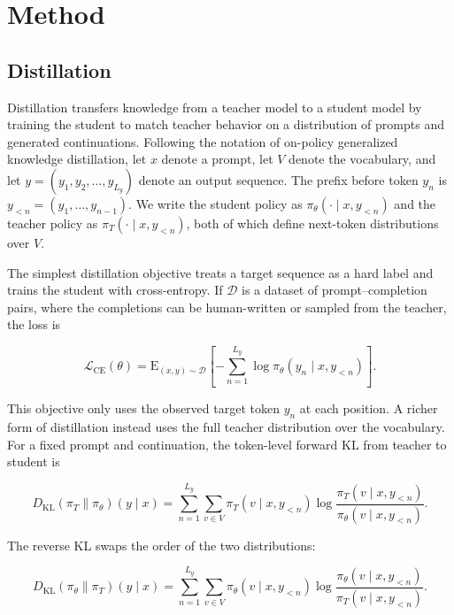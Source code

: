 \chapter{Method}

\section{Distillation}

Distillation transfers knowledge from a teacher model to a student model by training the student to match teacher behavior on a distribution of prompts and generated continuations. Following the notation of on-policy generalized knowledge distillation, let $x$ denote a prompt, let $V$ denote the vocabulary, and let $y = (y_1, y_2, \ldots, y_{L_y})$ denote an output sequence. The prefix before token $y_n$ is $y_{<n} = (y_1, \ldots, y_{n-1})$. We write the student policy as $\pi_\theta(\cdot \mid x, y_{<n})$ and the teacher policy as $\pi_T(\cdot \mid x, y_{<n})$, both of which define next-token distributions over $V$.

The simplest distillation objective treats a target sequence as a hard label and trains the student with cross-entropy. If $\mathcal{D}$ is a dataset of prompt--completion pairs, where the completions can be human-written or sampled from the teacher, the loss is

\begin{equation}
\mathcal{L}_{\mathrm{CE}}(\theta)
= \mathrm{E}_{(x,y) \sim \mathcal{D}}
\left[
- \sum_{n=1}^{L_y}
\log \pi_\theta(y_n \mid x, y_{<n})
\right].
\label{eq:xentropy}
\end{equation}

This objective only uses the observed target token $y_n$ at each position. A richer form of distillation instead uses the full teacher distribution over the vocabulary. For a fixed prompt and continuation, the token-level forward KL from teacher to student is

\begin{equation}
D_{\mathrm{KL}}(\pi_T \| \pi_\theta)(y \mid x)
= \sum_{n=1}^{L_y} \sum_{v \in V}
\pi_T(v \mid x, y_{<n})
\log
\frac{\pi_T(v \mid x, y_{<n})}
{\pi_\theta(v \mid x, y_{<n})}.
\label{eq:forward_kl}
\end{equation}

The reverse KL swaps the order of the two distributions:

\begin{equation}
D_{\mathrm{KL}}(\pi_\theta \| \pi_T)(y \mid x)
= \sum_{n=1}^{L_y} \sum_{v \in V}
\pi_\theta(v \mid x, y_{<n})
\log
\frac{\pi_\theta(v \mid x, y_{<n})}
{\pi_T(v \mid x, y_{<n})}.
\label{eq:reverse_kl}
\end{equation}

